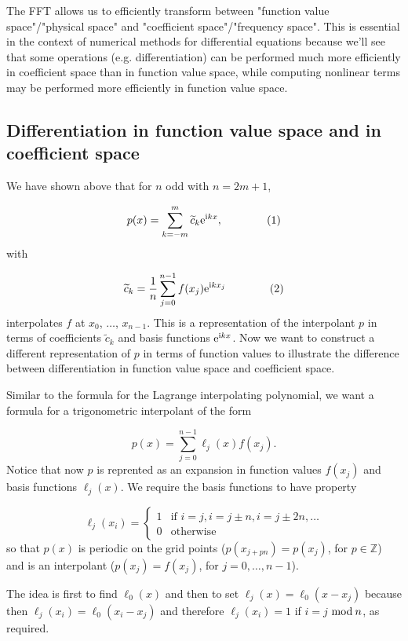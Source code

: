 \documentclass[12pt,landscape]{article}
\begin{document}
{The FFT allows us to efficiently transform between "function value space"/"physical space" and "coefficient space"/"frequency space".  This is essential in the context of numerical methods for differential equations because we'll see that some operations (e.g. differentiation) can be performed much more efficiently in coefficient space than in function value space, while computing nonlinear terms may be performed more efficiently in function value space.   

\subsection{Differentiation in function value space and in coefficient space}
We have shown above that for $n$ odd with $n = 2m+1$,

\[
p(x) = \sum_{k=-m}^{m} \widetilde{c}_k{\rm e}^{{\rm i}kx},  \qquad \qquad (1)
\]
with

\[
\widetilde{c}_k = \frac{1}{n}\sum_{j=0}^{n-1}f(x_j){\rm e}^{{\rm i}kx_j}  \qquad  \qquad (2)
\]
interpolates $f$ at $x_0$, $\ldots$, $x_{n-1}$. This is a representation of the interpolant $p$ in terms of coefficients $\widetilde{c}_k$ and basis functions ${\rm e}^{{\rm i}kx}$.   Now we want to construct a different representation of $p$ in terms of function values to illustrate the difference between differentiation in function value space and coefficient space. 

Similar to the formula for the Lagrange interpolating polynomial, we want a formula for a trigonometric interpolant of the form

\[
p(x) = \sum_{j=0}^{n-1}\ell_{j}(x) f(x_{j}).
\]
Notice that now $p$ is reprented as an expansion in function values $f(x_{j})$ and basis functions $\ell_{j}(x)$. We require the basis functions to have property

\[
\ell_{j}(x_i) = \begin{cases}
1 & \text{if } i = j, i = j \pm n, i = j \pm 2n, \ldots \\
0 & \text{otherwise } 
\end{cases}
\]
so that $p(x)$ is periodic on the grid points ($p(x_{j + pn}) = p(x_{j})$, for $p \in \mathbb{Z}$) and is an interpolant ($p(x_{j}) = f(x_{j})$, for $j = 0, \ldots, n-1$). 

The idea is first to find $\ell_0(x)$ and then to set $\ell_{j}(x) = \ell_0(x-x_j)$ because then  $\ell_{j}(x_i) = \ell_0(x_{i}-x_j)$ and therefore $\ell_{j}(x_{i}) = 1$ if  $i = j$ ${\rm mod } \:n$, as required.

}
\end{document}
